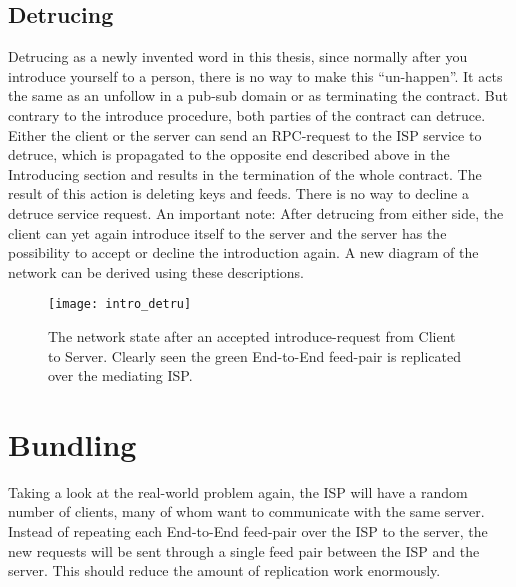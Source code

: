 \subsection{Detrucing}
Detrucing as a newly invented word in this thesis, since normally after you introduce yourself to a person, there is no way to make this “un-happen”. It acts the same as an unfollow in a pub-sub domain or as terminating the contract. But contrary to the introduce procedure, both parties of the contract can detruce.
Either the client or the server can send an RPC-request to the ISP service to detruce, which is propagated to the opposite end described above in the Introducing section and results in the termination of the whole contract. The result of this action is deleting keys and feeds. There is no way to decline a detruce service request. An important note: After detrucing from either side, the client can yet again introduce itself to the server and the server has the possibility to accept or decline the introduction again.
A new diagram of the network can be derived using these descriptions.
\begin{figure}
    \centering
    \texttt{[image: intro\_detru]}
    \caption{The network state after an accepted introduce-request from Client to Server. Clearly seen the green End-to-End feed-pair is replicated over the mediating ISP.}
    \label{fig:contract_cli_isp}
\end{figure}

\pagebreak

\section{Bundling}
Taking a look at the real-world problem again, the ISP will have a random number of clients, many of whom want to communicate with the same server. Instead of repeating each End-to-End feed-pair over the ISP to the server, the new requests will be sent through a single feed pair between the ISP and the server. This should reduce the amount of replication work enormously.

